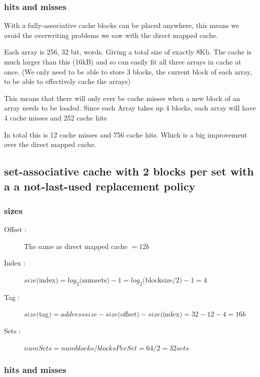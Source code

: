 \documentclass[12pt]{article}
\begin{document}
			\subsubsection{hits and misses}
			
				With a fully-associative cache blocks can be placed anywhere, this means we avoid the overwriting problems we saw with the direct mapped cache. 

				Each array is 256, 32 bit, words. Giving a total size of exactly 8Kb. The cache is much larger than this (16kB) and so can easily fit all three arrays in cache at once. (We only need to be able to store 3 blocks, the current block of each array, to be able to effectively cache the arrays)

				This means that there will only ever be cache misses when a new block of an array needs to be loaded. Since each Array takes up 4 blocks, each array will have 4 cache misses and 252 cache hits 

				In total this is 12 cache misses and 756 cache hits. Which is a big improvement over the direct mapped cache.

		\subsection{set-associative cache with 2 blocks per set with a a not-last-used replacement policy}

			\subsubsection{sizes}
			
				\begin{description}
					\item[Offset : ] The same as direct mapped cache $ = 12 b$
					\item[Index : ] $size($index$) = log_2($numsets$) -1 = log_2($blocksize$/2) -1 = 4$
					\item[Tag : ] $size($tag$) = addresssize- size($offset$) - size($index$) = 32 - 12 -4 = 16b$
					\item[Sets : ] $numSets = numblocks / blocksPerSet = 64/2 = 32 sets$

				\end{description}

			\subsubsection{hits and misses}
\end{document}
